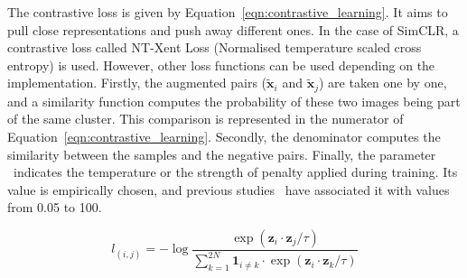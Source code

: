 \documentclass[12pt]{article}
\begin{document}
The contrastive loss is given by Equation~\ref{eqn:contrastive_learning}. It aims to pull close representations and push away different ones. In the case of SimCLR, a contrastive loss called NT-Xent Loss (Normalised temperature scaled cross entropy) is used. However, other loss functions can be used depending on the implementation. Firstly, the augmented pairs ($\tilde{\boldsymbol{x}}_i$ and $\tilde{\boldsymbol{x}}_j$) are taken one by one, and a similarity function computes the probability of these two images being part of the same cluster. This comparison is represented in the numerator of Equation~\ref{eqn:contrastive_learning}. Secondly, the denominator computes the similarity between the samples and the negative pairs. Finally, the parameter \texttau~indicates the temperature or the strength of penalty applied during training. Its value is empirically chosen, and previous studies~\citep{chen2020,caron2020} have associated it with values from 0.05 to 100. %

\begin{equation}
l_{(i,j)}=-\log{\frac{\exp{\left(\boldsymbol{z}_i\cdot\boldsymbol{z}_j/\tau\right)}}{\sum_{k=1}^{2N}\mathbf{1}_{i\neq k}\cdot\exp{\left(\boldsymbol{z}_i\cdot\boldsymbol{z}_k/\tau\right)}}}
\label{eqn:contrastive_learning}
\end{equation} 

\vspace{1.5em}
\end{document}
